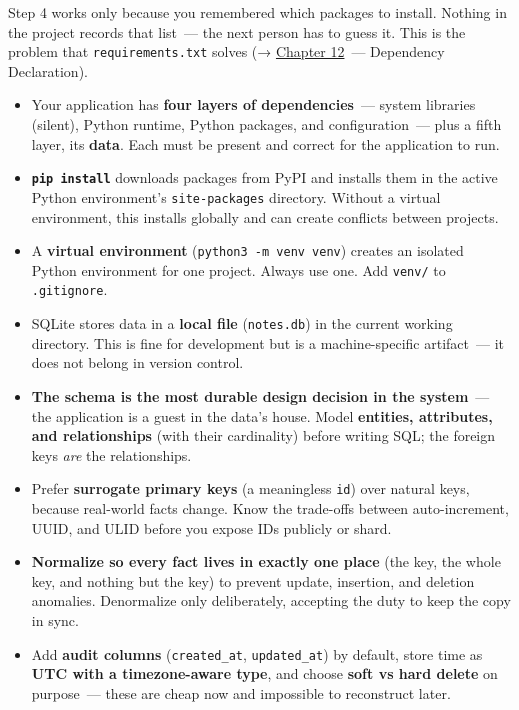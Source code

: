 \noindent{}Step 4 works only because you remembered which packages to install. Nothing in the project records that list~--- the next person has to guess it. This is the problem that \texttt{requirements.txt} solves (→ \hyperref[ch:12-dependency-declaration]{Chapter 12}~--- Dependency Declaration).

\label{06-local-dependencies:key-takeaways}
\begin{takeaways}

\begin{itemize}
\tightlist
\item
  Your application has \textbf{four layers of dependencies}~--- system libraries (silent), Python runtime, Python packages, and configuration~--- plus a fifth layer, its \textbf{data}. Each must be present and correct for the application to run.
\item
  \textbf{\texttt{pip\ install}} downloads packages from PyPI and installs them in the active Python environment's \texttt{site-packages} directory. Without a virtual environment, this installs globally and can create conflicts between projects.
\item
  A \textbf{virtual environment} (\texttt{python3\ -m\ venv\ venv}) creates an isolated Python environment for one project. Always use one. Add \texttt{venv/} to \texttt{.gitignore}.
\item
  SQLite stores data in a \textbf{local file} (\texttt{notes.db}) in the current working directory. This is fine for development but is a machine-specific artifact~--- it does not belong in version control.
\item
  \textbf{The schema is the most durable design decision in the system}~--- the application is a guest in the data's house. Model \textbf{entities, attributes, and relationships} (with their cardinality) before writing SQL; the foreign keys \emph{are} the relationships.
\item
  Prefer \textbf{surrogate primary keys} (a meaningless \texttt{id}) over natural keys, because real-world facts change. Know the trade-offs between auto-increment, UUID, and ULID before you expose IDs publicly or shard.
\item
  \textbf{Normalize so every fact lives in exactly one place} (the key, the whole key, and nothing but the key) to prevent update, insertion, and deletion anomalies. Denormalize only deliberately, accepting the duty to keep the copy in sync.
\item
  Add \textbf{audit columns} (\texttt{created\_at}, \texttt{updated\_at}) by default, store time as \textbf{UTC with a timezone-aware type}, and choose \textbf{soft vs hard delete} on purpose~--- these are cheap now and impossible to reconstruct later.

\end{itemize}
\end{takeaways}
